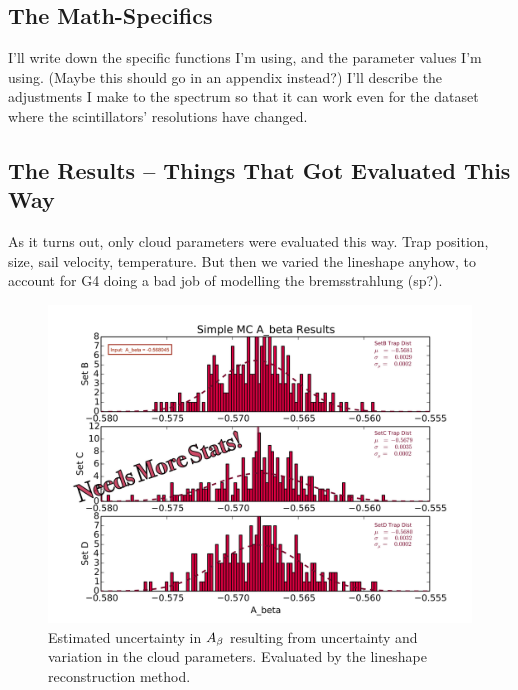 	\subsection{The Math-Specifics}
	I'll write down the specific functions I'm using, and the parameter values I'm using.  (Maybe this should go in an appendix instead?)  I'll describe the adjustments I make to the spectrum so that it can work even for the dataset where the scintillators' resolutions have changed.
	
	\subsection{The Results -- Things That Got Evaluated This Way}
	As it turns out, only cloud parameters were evaluated this way. 
Trap position, size, sail velocity, temperature.  But then we varied the lineshape anyhow, to account for G4 doing a bad job of modelling the bremsstrahlung (sp?).
	
	    \begin{figure}[h!!]
    	\centering
    	\includegraphics[width=.999\linewidth]
    	{Figures/Position_Err_Abeta_prelim.png}
    	\caption[$\Abeta$ Position Error]{Estimated uncertainty in $\Abeta$ resulting from uncertainty and variation in the cloud parameters.  Evaluated by the lineshape reconstruction method.}	
    	\label{fig:Abeta_position_err}
		\end{figure}


